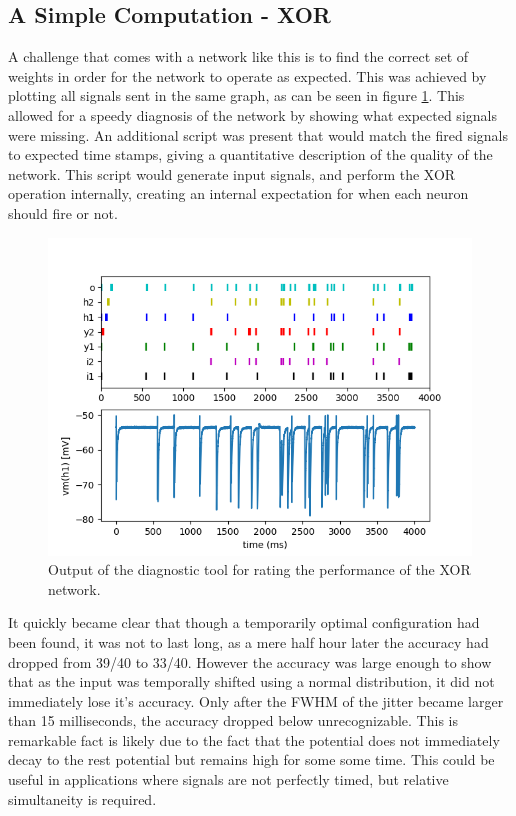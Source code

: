 \documentclass[10pt,a4paper]{article}
\begin{document}
\subsection{A Simple Computation - XOR}
A challenge that comes with a network like this is to find the correct set of
weights in order for the network to operate as expected. This was achieved by
plotting all signals sent in the same graph, as can be seen in figure
\ref{fig:XOR-output}. This allowed for a speedy diagnosis of the network by
showing what expected signals were missing. An additional script was present
that would match the fired signals to expected time stamps, giving a
quantitative description of the quality of the network. This script would
generate input signals, and perform the XOR operation internally, creating an
internal expectation for when each neuron should fire or not.

\begin{figure}
    \centering
    \includegraphics[width=\textwidth]{figures/XOR-output.png}
    \caption{Output of the diagnostic tool for rating the performance of the XOR network.}
    \label{fig:XOR-output}
\end{figure}

It quickly became clear that though a temporarily optimal configuration had been
found, it was not to last long, as a mere half hour later the accuracy had
dropped from 39/40 to 33/40. However the accuracy was large enough to show that
as the input was temporally shifted using a normal distribution, it did not
immediately lose it's accuracy. Only after the FWHM of the jitter became larger
than 15 milliseconds, the accuracy dropped below unrecognizable. This is
remarkable fact is likely due to the fact that the potential does not
immediately decay to the rest potential but remains high for some some time.
This could be useful in applications where signals are not perfectly timed, but
relative simultaneity is required.
\end{document}
